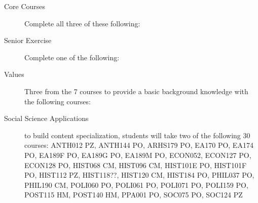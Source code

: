 \documentclass{article}\usepackage[]{graphicx}\usepackage[]{xcolor}
\newenvironment{itemize*}%
  {\begin{itemize}%
    \setlength{\itemsep}{0pt}%
    \setlength{\parskip}{0pt}}%
  {\end{itemize}}
\begin{document}
\begin{description}

  \item[Core Courses] Complete all three of these following:
  

  \item[Senior Exercise] Complete one of the following:
  


\item[Values] Three from the 7 courses to provide a basic background knowledge with the following courses:



\item[Social Science Applications] to build content specialization, students will take two of the following 30 courses: ANTH012 PZ, ANTH144 PO, ARHS179 PO, EA170 PO, EA174 PO, EA189F PO, EA189G PO, EA189M PO, ECON052, ECON127 PO, ECON128 PO, HIST068 CM, HIST096 CM, HIST101E PO, HIST101F PO, HIST112 PZ, HIST118??, HIST120 CM, HIST184 PO, PHIL037 PO, PHIL190 CM, POLI060 PO, POLI061 PO, POLI071 PO, POLI159 PO, POST115 HM, POST140 HM, PPA001 PO, SOC075 PO, SOC124 PZ



\end{description}
\end{document}
